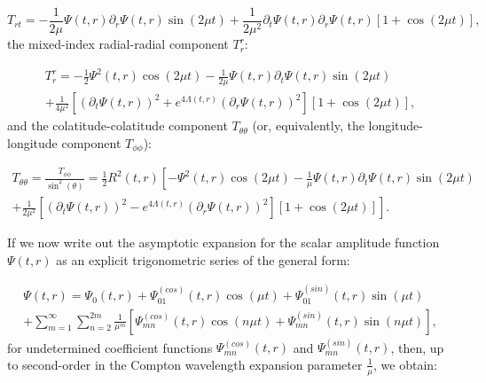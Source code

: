 \documentclass{article}
\begin{document}
\begin{equation}
T_{r t} = - \frac{1}{2 \mu} \Psi \left( t, r \right) \partial_r \Psi \left( t, r \right) \sin \left( 2 \mu t \right) + \frac{1}{2 \mu^2} \partial_t \Psi \left( t, r \right) \partial_r \Psi \left( t, r \right) \left[ 1 + \cos \left( 2 \mu t \right) \right],
\end{equation}
the mixed-index radial-radial component ${T_{r}^{r}}$:

\begin{multline}
T_{r}^{r} = - \frac{1}{2} \Psi^2 \left( t, r \right) \cos \left( 2 \mu t \right) - \frac{1}{2 \mu} \Psi \left( t, r \right) \partial_t \Psi \left( t, r \right) \sin \left( 2 \mu t \right)\\
+ \frac{1}{4 \mu^2} \left[ \left( \partial_t \Psi \left( t, r \right) \right)^2 + e^{4 \Lambda \left( t, r \right)} \left( \partial_r \Psi \left( t, r \right) \right)^2 \right] \left[ 1 + \cos \left( 2 \mu t \right) \right],
\end{multline}
and the colatitude-colatitude component ${T_{\theta \theta}}$ (or, equivalently, the longitude-longitude component ${T_{\phi \phi}}$):

\begin{multline}
T_{\theta \theta} = \frac{T_{\phi \phi}}{\sin^2 \left( \theta \right)} = \frac{1}{2} R^2 \left( t, r \right) \left[ - \Psi^2 \left( t, r \right) \cos \left( 2 \mu t \right) - \frac{1}{\mu} \Psi \left( t, r \right) \partial_t \Psi \left( t, r \right) \sin \left( 2 \mu t \right) \right.\\
\left. + \frac{1}{2 \mu^2} \left[ \left( \partial_t \Psi \left( t, r \right) \right)^2 - e^{4 \Lambda \left( t, r \right)} \left( \partial_r \Psi \left( t, r \right) \right)^2 \right] \left[ 1 + \cos \left( 2 \mu t \right) \right] \right].
\end{multline}

If we now write out the asymptotic expansion for the scalar amplitude function ${\Psi \left( t, r \right)}$ as an explicit trigonometric series of the general form:

\begin{multline}
\Psi \left( t, r \right) = \Psi_0 \left( t, r \right) + \Psi_{0 1}^{\left( cos \right)} \left( t, r \right) \cos \left( \mu t \right) + \Psi_{0 1}^{\left( sin \right)} \left( t, r \right) \sin \left( \mu t \right)\\
+ \sum_{m = 1}^{\infty} \sum_{n = 2}^{2m} \frac{1}{\mu^m} \left[ \Psi_{m n}^{\left( cos \right)} \left( t, r \right) \cos \left( n \mu t \right) + \Psi_{m n}^{\left( sin \right)} \left( t, r \right) \sin \left( n \mu t \right) \right],
\end{multline}
for undetermined coefficient functions ${\Psi_{m n}^{\left( cos \right)} \left( t, r \right)}$ and ${\Psi_{m n}^{\left( sin \right)} \left( t, r \right)}$, then, up to second-order in the Compton wavelength expansion parameter ${\frac{1}{\mu}}$, we obtain:
\end{document}
